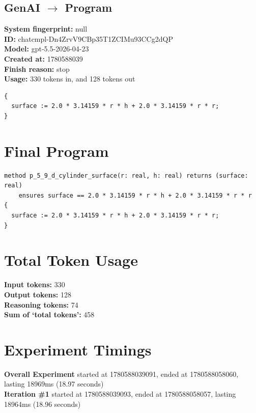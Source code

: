 \documentclass{article}
\begin{document}
\subsection*{GenAI $\rightarrow$ Program}
\textbf{System fingerprint: }null
\\\textbf{ID: }chatcmpl-Dn4ZrvV9CBp35T1ZCIMu93CCg2dQP
\\\textbf{Model: }gpt-5.5-2026-04-23
\\\textbf{Created at: }1780588039
\\\textbf{Finish reason: }stop
\\\textbf{Usage: }330 tokens in, and 128 tokens out
\begin{lstlisting}
{
  surface := 2.0 * 3.14159 * r * h + 2.0 * 3.14159 * r * r;
}
\end{lstlisting}
\section*{Final Program}
\begin{lstlisting}
method p_5_9_d_cylinder_surface(r: real, h: real) returns (surface: real)
	ensures surface == 2.0 * 3.14159 * r * h + 2.0 * 3.14159 * r * r
{
  surface := 2.0 * 3.14159 * r * h + 2.0 * 3.14159 * r * r;
}
\end{lstlisting}
\section*{Total Token Usage}
\textbf{Input tokens: }330
\\\textbf{Output tokens: }128
\\\textbf{Reasoning tokens: }74
\\\textbf{Sum of `total tokens': }458
\section*{Experiment Timings}
\textbf{Overall Experiment} started at 1780588039091, ended at 1780588058060, lasting 18969ms (18.97 seconds)
\\\textbf{Iteration \#1} started at 1780588039093, ended at 1780588058057, lasting 18964ms (18.96 seconds)
\end{document}
